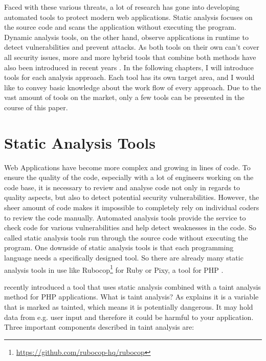 Faced with these various threats, a lot of research has gone into developing automated tools to protect modern web applications. Static analysis focuses on the source code and scans the application without executing the program. Dynamic analysis tools, on the other hand, observe applications in runtime to detect vulnerabilities and prevent attacks. As both tools on their own can't cover all security issues, more and more hybrid tools that combine both methods have also been introduced in recent years \autocite[]{Jahanshahi2018, Lam2008, Hosek2011}.\newline 
In the following chapters, I will introduce tools for each analysis approach. Each tool has its own target area, and I would like to convey basic knowledge about the work flow of every approach. Due to the vast amount of tools on the market, only a few tools can be presented in the course of this paper.


\section{Static Analysis Tools}
Web Applications have become more complex and growing in lines of code. To ensure the quality of the code, especially with a lot of engineers working on the code base, it is necessary to review and analyse code not only in regards to quality aspects, but also to detect potential security vulnerabilities. However, the sheer amount of code makes it impossible to completely rely on individual coders to review the code manually. Automated analysis tools provide the service to check code for various vulnerabilities and help detect weaknesses in the code. So called static analysis tools run through the source code without executing the program. One downside of static analysis tools is that each programming language needs a specifically designed tool. So there are already many static analysis tools in use like Rubocop\footnote{ \url{https://github.com/rubocop-hq/rubocop}} for Ruby or Pixy, a tool for PHP \autocite[]{Jovanovic2006}. \newline 

\textcite[]{Maskur2019} recently introduced a tool that uses static analysis combined with a taint analysis method for PHP applications. What is taint analysis? As \textcite[]{Shannon2018} explains it is a variable that is marked as tainted, which means it is potentially dangerous. It may hold data from e.g. user input and therefore it could be harmful to your application. Three important components described in taint analysis are:

